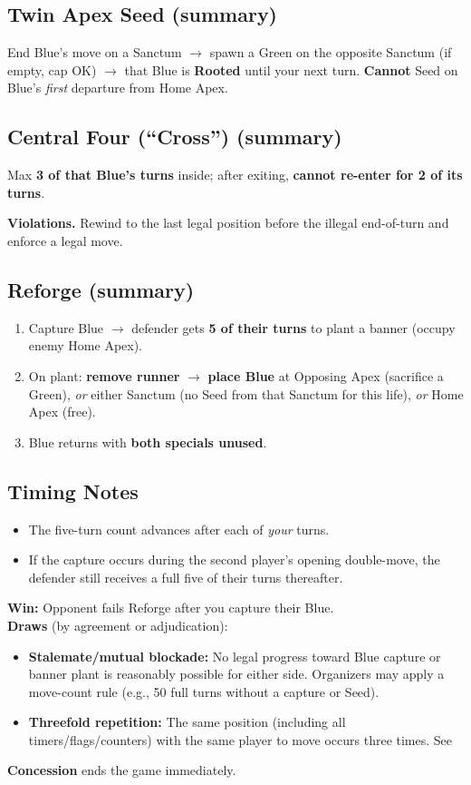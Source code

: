 \documentclass[11pt]{article}
\begin{document}
\subsection*{Twin Apex Seed (summary)}
End Blue’s move on a Sanctum $\rightarrow$ spawn a Green on the opposite Sanctum (if empty, cap OK) $\rightarrow$ that Blue is \textbf{Rooted} until your next turn. \textbf{Cannot} Seed on Blue’s \emph{first} departure from Home Apex.

\subsection*{Central Four (“Cross”) (summary)}
Max \textbf{3 of that Blue’s turns} inside; after exiting, \textbf{cannot re-enter for 2 of its turns}.

\noindent\textbf{Violations.} Rewind to the last legal position before the illegal end-of-turn and enforce a legal move.

\subsection*{Reforge (summary)}
\begin{enumerate}
  \item Capture Blue $\rightarrow$ defender gets \textbf{5 of their turns} to plant a banner (occupy enemy Home Apex).
  \item On plant: \textbf{remove runner} $\rightarrow$ \textbf{place Blue} at Opposing Apex (sacrifice a Green), \emph{or} either Sanctum (no Seed from that Sanctum for this life), \emph{or} Home Apex (free).
  \item Blue returns with \textbf{both specials unused}.
\end{enumerate}

\subsection*{Timing Notes}
\begin{itemize}
  \item The five-turn count advances after each of \emph{your} turns.
  \item If the capture occurs during the second player’s opening double-move, the defender still receives a full five of their turns thereafter.
\end{itemize}

\textbf{Win:} Opponent fails Reforge after you capture their Blue.\\
\textbf{Draws} (by agreement or adjudication):
\begin{itemize}
  \item \textbf{Stalemate/mutual blockade:} No legal progress toward Blue capture or banner plant is reasonably possible for either side. Organizers may apply a move-count rule (e.g., 50 full turns without a capture or Seed).
  \item \textbf{Threefold repetition:} The same position (including all timers/flags/counters) with the same player to move occurs three times. See 
\end{itemize}
\textbf{Concession} ends the game immediately.
\end{document}
